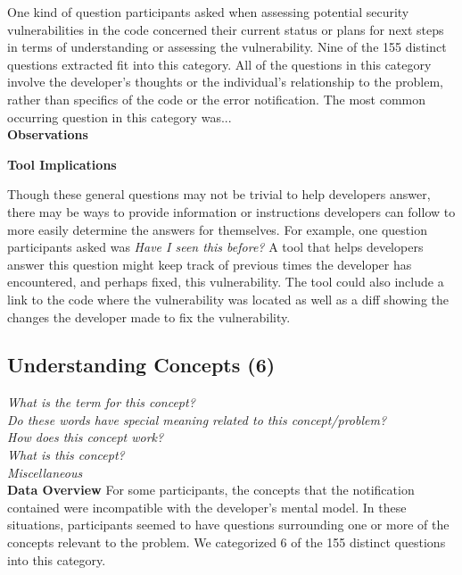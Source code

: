 \documentclass[conference]{IEEEtran}
\begin{document}
One kind of question participants asked when assessing potential security vulnerabilities in the code concerned their current status or plans for next steps in terms of understanding or assessing the vulnerability. Nine of the 155 distinct questions extracted fit into this category. All of the questions in this category involve the developer's thoughts or the individual's relationship to the problem, rather than specifics of the code or the error notification.  The most common occurring question in this category was...
\\

\noindent\textbf{Observations}



\noindent\textbf{Tool Implications}

Though these general questions may not be trivial to help developers answer, there may be ways to provide information or instructions developers can follow to more easily determine the answers for themselves. 
For example, one question participants asked was \textit{Have I seen this before?}
A tool that helps developers answer this question might keep track of previous times the developer has encountered, and perhaps fixed, this vulnerability. 
The tool could also include a link to the code where the vulnerability was located as well as a diff showing the changes the developer made to fix the vulnerability.



\noindent\subsection{\textbf{Understanding Concepts (6)}}\label{uc}

\noindent\emph{What is the term for this concept?} \\
\emph{Do these words have special meaning related to this concept/problem?} \\
\emph{How does this concept work?} \\
\emph{What is this concept?} \\
\emph{Miscellaneous} \\


\noindent\textbf{Data Overview}
For some participants, the concepts that the notification contained were incompatible with the developer's mental model. 
In these situations, participants seemed to have questions surrounding one or more of the concepts relevant to the problem.
We categorized 6 of the 155 distinct questions into this category. 
\\
\end{document}
